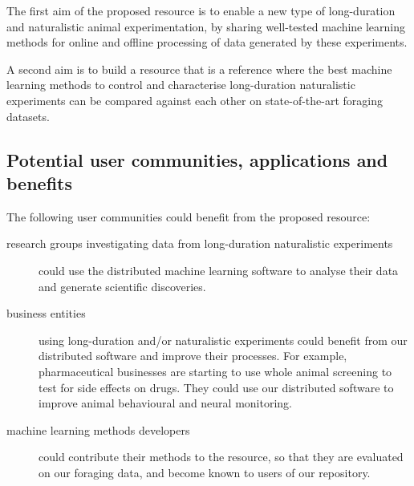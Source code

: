 The first aim of the proposed resource is to enable a new type of
long-duration and naturalistic animal experimentation, by sharing well-tested
machine learning methods for online and offline processing of data generated by
these experiments.

A second aim is to build a resource that is a reference where the best machine
learning methods to control and characterise long-duration naturalistic
experiments can be compared against each other on state-of-the-art foraging
datasets.

\subsection{Potential user communities, applications and benefits}

The following user communities could benefit from the proposed resource:

\begin{description}

    \item[research groups investigating data from long-duration naturalistic
        experiments] could use the distributed machine learning software to analyse their
        data and generate scientific discoveries.

    \item[business entities] using long-duration and/or naturalistic
        experiments could benefit from our distributed software and improve
        their processes. For example, pharmaceutical businesses are starting to
        use whole animal screening to test for side effects on drugs. They
        could use our distributed software to improve animal behavioural and
        neural monitoring.

    \item[machine learning methods developers] could contribute their methods
        to the resource, so that they are evaluated on our foraging data, and
        become known to users of our repository.

\end{description}

